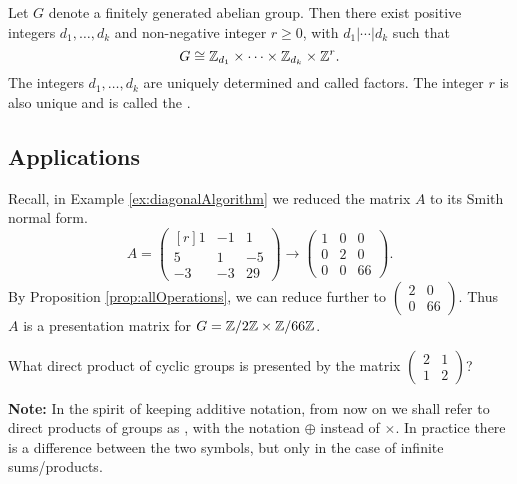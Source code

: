 \documentclass[../algebraNotesMSRI-UP2016.tex]{subfiles}
\begin{document}
\begin{frame}[c]{}{}
\begin{thm}\label{thm:ftofgab}
Let $G$ denote a finitely generated abelian group.  Then there exist positive integers $d_1,\dots,d_k$ and non-negative integer $r\geq 0$, with $d_1|\cdots|d_k$ such that
\[
G\cong\mathbb Z_{d_1}\times\cdots\times\mathbb Z_{d_k}\times\mathbb Z^r.
\]
The integers $d_1,\dots,d_k$ are uniquely determined and called  factors.  The integer $r$ is also unique and is called the .
\end{thm}
\end{frame}

\subsection[\subsecname]{Applications}
\begin{frame}[c]{\subsecname}{}
\begin{ex}
Recall, in Example \ref{ex:diagonalAlgorithm} we reduced the matrix $A$ to its Smith normal form. 
\[
A=\begin{pmatrix*}[r]
	1 & -1 & 1 \\
	5 & 1 & -5 \\
	-3 & -3 & 29
	\end{pmatrix*}\to 
\begin{pmatrix}
1 & 0 & 0 \\
0 & 2 & 0 \\
0 & 0 & 66
\end{pmatrix}.
\]
By Proposition \ref{prop:allOperations}, we can reduce further to $\left(\begin{smallmatrix}
	2 & 0 \\
	0 & 66
	\end{smallmatrix}\right)$.  Thus $A$ is a presentation matrix for $G=\mathbb Z/2\mathbb Z\times \mathbb Z/66\mathbb Z$.
\end{ex}
\end{frame}

\begin{frame}[c]
\begin{exe}[cf. Problem 79]\label{exe:prob79}
What direct product of cyclic groups is presented by the matrix $\begin{pmatrix}
2 & 1 \\
1 & 2
\end{pmatrix}$? 
\end{exe}

\smallGap
\textbf{Note:} In the spirit of keeping additive notation, from now on we shall refer to direct products of groups as , with the notation $\oplus$ instead of $\times$.  In practice there is a difference between the two symbols, but only in the case of infinite sums/products.
\end{frame}
\end{document}
